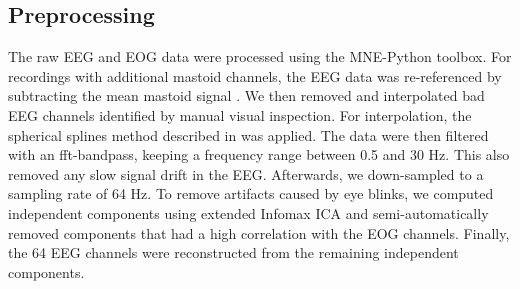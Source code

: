 \subsection*{Preprocessing}
The raw EEG and EOG data were processed using the MNE-Python toolbox. 
For recordings with additional mastoid channels, the EEG data was re-referenced by subtracting the mean mastoid signal \cite{teplan_fundamentals_2002}.
We then removed and interpolated bad EEG channels identified by manual visual inspection.
For interpolation, the spherical splines method described in \cite{perrin_spherical_1989} was applied.
The data were then filtered with an fft-bandpass, keeping a frequency range between 0.5 and 30 Hz.
This also removed any slow signal drift in the EEG.
Afterwards, we down-sampled to a sampling rate of 64 Hz.
To remove artifacts caused by eye blinks, we computed independent components using extended Infomax \ac{ICA} \cite{lee_independent_1999} and semi-automatically removed components that had a high correlation with the EOG channels.
Finally, the 64 EEG channels were reconstructed from the remaining independent components.